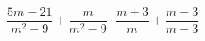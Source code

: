 \begin{ex}[type=expression]
	\begin{condition}
		\( \dfrac{5m-21}{m^2-9}+\dfrac{m}{m^2-9}\cdot\dfrac{m+3}{m}+\dfrac{m-3}{m+3} \)
	\end{condition}
\end{ex}